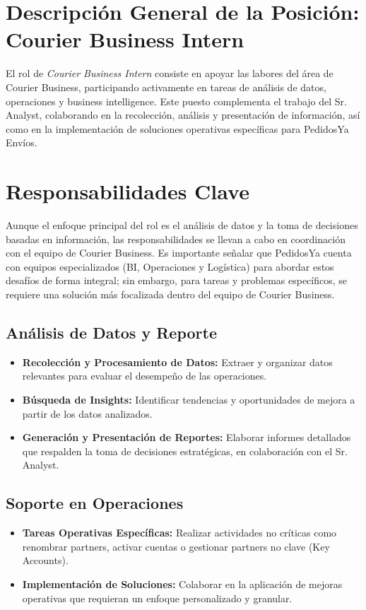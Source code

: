\section{Descripción General de la Posición: Courier Business Intern \label{sec:sec1}}
El rol de \textit{Courier Business Intern} consiste en apoyar las labores del área de Courier Business, participando activamente en tareas de análisis de datos, operaciones y business intelligence. Este puesto complementa el trabajo del Sr. Analyst, colaborando en la recolección, análisis y presentación de información, así como en la implementación de soluciones operativas específicas para PedidosYa Envíos.

\section{Responsabilidades Clave \label{sec:sec2}}
Aunque el enfoque principal del rol es el análisis de datos y la toma de decisiones basadas en información, las responsabilidades se llevan a cabo en coordinación con el equipo de Courier Business. Es importante señalar que PedidosYa cuenta con equipos especializados (BI, Operaciones y Logística) para abordar estos desafíos de forma integral; sin embargo, para tareas y problemas específicos, se requiere una solución más focalizada dentro del equipo de Courier Business.

\subsection{Análisis de Datos y Reporte}
\begin{itemize}
  \item \textbf{Recolección y Procesamiento de Datos:} Extraer y organizar datos relevantes para evaluar el desempeño de las operaciones.
  \item \textbf{Búsqueda de Insights:} Identificar tendencias y oportunidades de mejora a partir de los datos analizados.
  \item \textbf{Generación y Presentación de Reportes:} Elaborar informes detallados que respalden la toma de decisiones estratégicas, en colaboración con el Sr. Analyst.
\end{itemize}

\subsection{Soporte en Operaciones}
\begin{itemize}
  \item \textbf{Tareas Operativas Específicas:} Realizar actividades no críticas como renombrar partners, activar cuentas o gestionar partners no clave (Key Accounts).
  \item \textbf{Implementación de Soluciones:} Colaborar en la aplicación de mejoras operativas que requieran un enfoque personalizado y granular.
\end{itemize}

